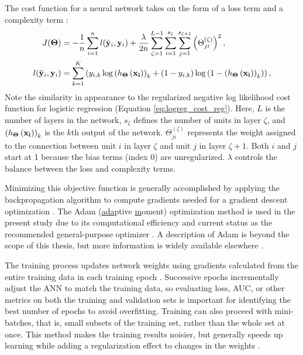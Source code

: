 The cost function for a neural network takes on the form of a loss term and a complexity term \citep{ng_neural_2011}:
\begin{equation}
\label{eq:nn_cost_function}
    \begin{aligned}
        J(\boldsymbol\Theta) &= 
        -\frac{1}{n}\sum_{i=1}^{n} 
        l(\hat{\bf y}_i,{\bf y}_i) + 
        \frac{\lambda}{2n}
        \sum_{\zeta=1}^{L-1}
        \sum_{i=1}^{s_\zeta}
        \sum_{j=1}^{s_{\zeta+1}}\left(\Theta_{ji}^{(\zeta)}\right)^2, \\
        l(\hat{\bf y}_i,{\bf y}_i)&= 
        \sum_{k=1}^{K}\left( 
        y_{i,k}\log{\left(h_{\boldsymbol\Theta}\left(\bf{x}_i\right)\right)_k}+ 
        \left(1-y_{i,k}\right)\log\left(1-\left(h_{\boldsymbol\Theta}\left(\bf{x}_i\right)\right)_k\right)\right),
    \end{aligned}
\end{equation}
Note the similarity in appearance to the regularized negative log likelihood cost function for logistic regression (Equation \ref{eq:logreg_cost_reg}). Here, $L$ is the number of layers in the network, $s_\zeta$ defines the number of units in layer $\zeta$, and $\left(h_{\boldsymbol\Theta}\left(\bf{x}_i\right)\right)_k$ is the $k$th output of the network. $\Theta_{ji}^{(\zeta)}$ represents the weight assigned to the connection between unit $i$ in layer $\zeta$ and unit $j$ in layer $\zeta+1$. Both $i$ and $j$ start at 1 because the bias terms (index 0) are unregularized. $\lambda$ controls the balance between the loss and complexity terms. 

Minimizing this objective function is generally accomplished by applying the backpropagation algorithm to compute gradients needed for a gradient descent optimization \citep[p.\ 396]{hastie_elements_2009}. The Adam (\uline{ada}ptive \uline{m}oment) optimization method is used in the present study due to its computational efficiency and current status as the recommended general-purpose optimizer \citep{brownlee_gentle_2017}. A description of Adam is beyond the scope of this thesis, but more information is widely available elsewhere \citep[e.g.,\ ][]{kingma_adam_2017}.

The training process updates network weights using gradients calculated from the entire training data in each training epoch \citep[p.\ 397]{hastie_elements_2009}. Successive epochs incrementally adjust the ANN to match the training data, so evaluating loss, AUC, or other metrics on both the training and validation sets is important for identifying the best number of epochs to avoid overfitting. Training can also proceed with mini-batches, that is, small subsets of the training set, rather than the whole set at once. This method makes the training results noisier, but generally speeds up learning while adding a regularization effect to changes in the weights \citep{brownlee_how_2019}.

